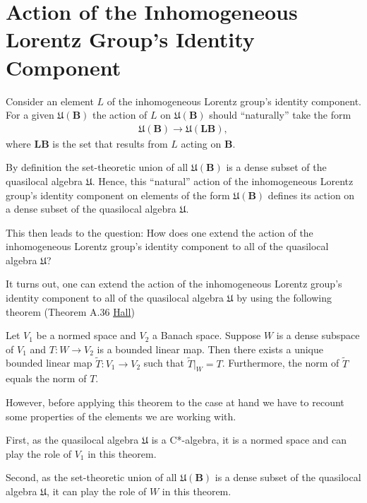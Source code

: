 \section{Action of the Inhomogeneous Lorentz Group's Identity Component}\label{sctn:action-of-the-inhomogeneous-lorentz-groups-identity-component}
Consider an element $L$ of the inhomogeneous Lorentz group's identity component. For a given $\mathfrak{U}(\mathbf{B})$ the action of $L$ on $\mathfrak{U}(\mathbf{B})$ should ``naturally'' take the form
\begin{align}
    \mathfrak{U}(\mathbf{B}) \rightarrow \mathfrak{U}(\mathbf{LB}),
\end{align}
where $\mathbf{LB}$ is the set that results from $L$ acting on $\mathbf{B}$.

By definition the set-theoretic union of all $\mathfrak{U}(\mathbf{B})$ is a dense subset of the quasilocal algebra $\mathfrak{U}$. Hence, this ``natural'' action of the inhomogeneous Lorentz group's identity component on elements of the form $\mathfrak{U}(\mathbf{B})$ defines its action on a dense subset of the quasilocal algebra $\mathfrak{U}$.

This then leads to the question: How does one extend the action of the inhomogeneous Lorentz group's identity component to all of the quasilocal algebra $\mathfrak{U}$?

It turns out, one can extend the action of the inhomogeneous Lorentz group's identity component to all of the quasilocal algebra $\mathfrak{U}$ by using the following theorem (Theorem A.36 \href{https://doi.org/10.1007/978-1-4614-7116-5}{Hall})
\begin{theorem}
    Let $V_1$ be a normed space and $V_2$ a Banach space. Suppose $W$ is a dense subspace of $V_1$ and $T: W \rightarrow V_2$ is a bounded linear map. Then there exists a unique bounded linear map $\widetilde{T}: V_1 \rightarrow V_2$ such that $\widetilde{T}|_W = T$. Furthermore, the norm of $\widetilde{T}$ equals the norm of $T$.
\end{theorem}
\noindent However, before applying this theorem to the case at hand we have to recount some properties of the elements we are working with.

First, as the quasilocal algebra $\mathfrak{U}$ is a C*-algebra, it is a normed space and can play the role of $V_1$ in this theorem.

Second, as the set-theoretic union of all $\mathfrak{U}(\mathbf{B})$ is a dense subset of the quasilocal algebra $\mathfrak{U}$, it can play the role of $W$ in this theorem.

